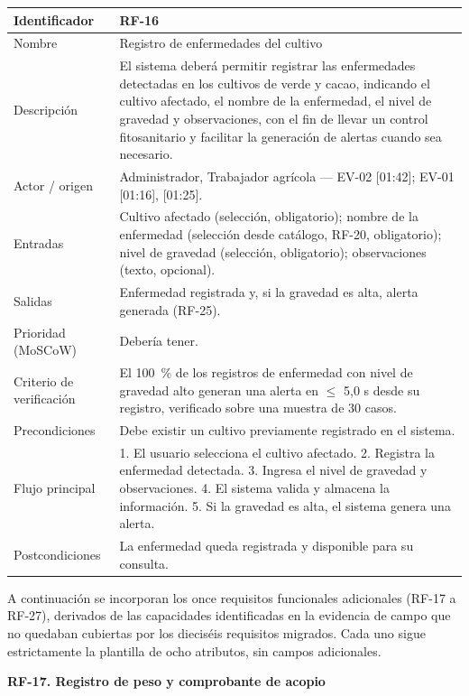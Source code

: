 \documentclass[12pt,a4paper]{article}
\begin{document}
\begin{center}
\begin{longtable}{|p{3.5cm}|p{10.7cm}|}
\hline
Identificador & RF-16 \\
\hline
Nombre & Registro de enfermedades del cultivo \\
\hline
Descripción & El sistema deberá permitir registrar las enfermedades detectadas en los cultivos de verde y cacao, indicando el cultivo afectado, el nombre de la enfermedad, el nivel de gravedad y observaciones, con el fin de llevar un control fitosanitario y facilitar la generación de alertas cuando sea necesario. \\
\hline
Actor / origen & Administrador, Trabajador agrícola --- EV-02 [01:42]; EV-01 [01:16], [01:25]. \\
\hline
Entradas & Cultivo afectado (selección, obligatorio); nombre de la enfermedad (selección desde catálogo, RF-20, obligatorio); nivel de gravedad (selección, obligatorio); observaciones (texto, opcional). \\
\hline
Salidas & Enfermedad registrada y, si la gravedad es alta, alerta generada (RF-25). \\
\hline
Prioridad (MoSCoW) & Debería tener. \\
\hline
Criterio de verificación & El 100~\% de los registros de enfermedad con nivel de gravedad alto generan una alerta en $\leq$ 5,0 s desde su registro, verificado sobre una muestra de 30 casos. \\
\hline
Precondiciones & Debe existir un cultivo previamente registrado en el sistema. \\
\hline
Flujo principal & 1. El usuario selecciona el cultivo afectado. 2. Registra la enfermedad detectada. 3. Ingresa el nivel de gravedad y observaciones. 4. El sistema valida y almacena la información. 5. Si la gravedad es alta, el sistema genera una alerta. \\
\hline
Postcondiciones & La enfermedad queda registrada y disponible para su consulta. \\
\hline
\end{longtable}
\end{center}

A continuación se incorporan los once requisitos funcionales adicionales (RF-17 a RF-27), derivados de las capacidades identificadas en la evidencia de campo que no quedaban cubiertas por los dieciséis requisitos migrados. Cada uno sigue estrictamente la plantilla de ocho atributos, sin campos adicionales.

\bigskip
\noindent\textbf{RF-17. Registro de peso y comprobante de acopio}
\label{tab:RF-17}
\end{document}
